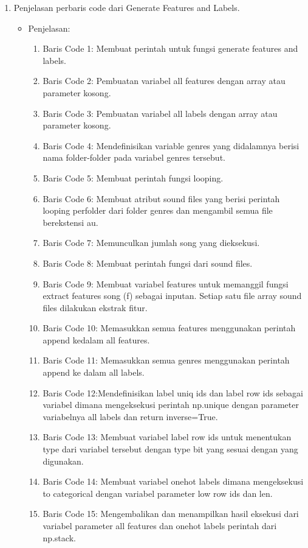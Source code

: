 \begin{enumerate}
\item Penjelasan perbaris code dari Generate Features and Labels.
\begin{itemize}
\item Penjelasan:
\begin{enumerate}
\item Baris Code 1: Membuat perintah untuk fungsi generate features and labels.
\item Baris Code 2: Pembuatan variabel all features dengan array atau parameter kosong.
\item Baris Code 3: Pembuatan variabel all labels dengan array atau parameter kosong.
\item Baris Code 4: Mendefinisikan variable genres yang didalamnya berisi nama folder-folder pada variabel genres tersebut.
\item Baris Code 5: Membuat perintah fungsi looping.
\item Baris Code 6: Membuat atribut sound files yang berisi perintah looping perfolder dari folder genres dan mengambil semua file berekstensi au.
\item Baris Code 7: Memunculkan jumlah song yang dieksekusi.
\item Baris Code 8: Membuat perintah fungsi dari sound files.
\item Baris Code 9: Membuat variabel features untuk memanggil fungsi extract features song (f) sebagai inputan. Setiap satu file array sound files dilakukan ekstrak fitur.
\item Baris Code 10: Memasukkan semua features menggunakan perintah append kedalam all features.
\item Baris Code 11: Memasukkan semua genres menggunakan perintah append ke dalam all labels.
\item Baris Code 12:Mendefinisikan label uniq ids dan label row ids sebagai variabel dimana mengeksekusi perintah np.unique dengan parameter variabelnya all labels dan return inverse=True.
\item Baris Code 13: Membuat variabel label row ids untuk menentukan type dari variabel tersebut dengan type bit yang sesuai dengan yang digunakan.
\item Baris Code 14: Membuat variabel onehot labels dimana mengeksekusi to categorical dengan variabel parameter low row ids dan len.
\item Baris Code 15: Mengembalikan dan menampilkan hasil eksekusi dari variabel parameter all features dan onehot labels perintah dari np.stack.
\end{enumerate}


\end{itemize}
\end{enumerate}
